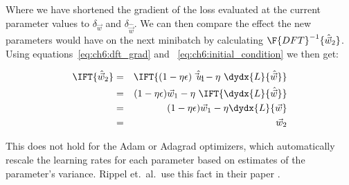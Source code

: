 Where we have shortened the gradient of the loss evaluated at the current
parameter values to $\delta_{\vec{w}}$ and $\delta_{\hat{\vec{w}}}$.
We can then compare the effect the new parameters would have on the next
minibatch by calculating $\F{DFT}^{-1} \{\hat{\vec{w}}_2 \}$. Using
equations~\ref{eq:ch6:dft_grad} and ~\ref{eq:ch6:initial_condition} we then get:

\begin{eqnarray}
  \IFT{\hat{\vec{w}}_2} &=& \IFT{(1-\eta\epsilon)\hat{\vec{w}_1} - \eta\ \dydx{L}{\hat{\vec{w}}}} \\       
                        & = & (1-\eta\epsilon)\vec{w}_1 - \eta\ \IFT{ \dydx{L}{\hat{\vec{w}}}} \\
                        & = & (1-\eta\epsilon)\vec{w}_1 - \eta \dydx{L}{\vec{w}} \\
                        & = & \vec{w}_2
\end{eqnarray}


This does not hold for the Adam \cite{kingma_adam:_2014} or Adagrad \cite{}
optimizers, which automatically rescale the learning rates for each parameter
based on estimates of the parameter's variance. Rippel et.\ al.\ use this fact
in their paper \cite{rippel_spectral_2015}.

